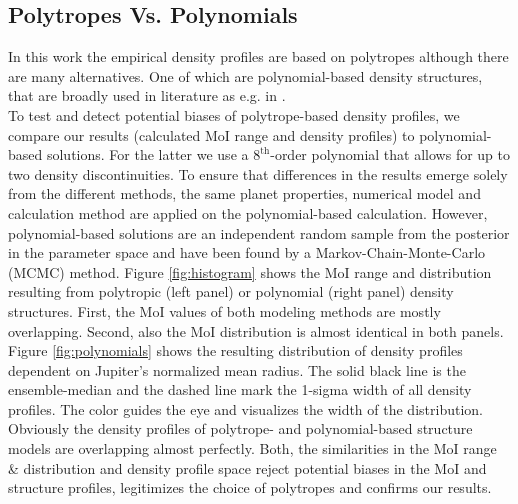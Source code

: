 \documentclass[usenatbib]{mnras}
\begin{document}
\subsection{Polytropes Vs. Polynomials}  \label{subsection:comparison_to_polynomials}
In this work the empirical density profiles are based on polytropes although there are many alternatives. One of which are polynomial-based density structures, that are broadly used in literature as e.g. in \cite{2011Helled, HELLED2011440, Anderson2007}.\\ 
To test and detect potential biases of polytrope-based density profiles, we compare our results (calculated MoI range and density profiles) to polynomial-based solutions. For the latter we use a $8^{\text{th}}$-order polynomial that allows for up to two density discontinuities. To ensure that differences in the results emerge solely from the different methods, the same planet properties, numerical model and calculation method are applied on the polynomial-based calculation. However, polynomial-based solutions are an independent random sample from the posterior in the parameter space and have been found by a Markov-Chain-Monte-Carlo (MCMC) method.
Figure  \ref{fig:histogram} shows the MoI range and distribution resulting from polytropic (left panel) or polynomial (right panel) density structures.
First, the MoI values of both modeling methods are mostly overlapping. Second, also the MoI distribution is almost identical in both panels.
Figure \ref{fig:polynomials} shows the resulting distribution of density profiles dependent on Jupiter's normalized mean radius. The solid black line is the ensemble-median and the dashed line mark the 1-sigma width of all density profiles. The color guides the eye and visualizes the width of the distribution.
Obviously the density profiles of polytrope- and polynomial-based structure models are overlapping almost perfectly.
Both, the similarities in the MoI range \& distribution and density profile space reject potential biases in the MoI and structure profiles, legitimizes the choice of polytropes and confirms our results.
\end{document}
